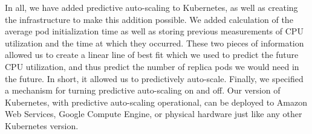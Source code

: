 In all, we have added predictive auto-scaling to Kubernetes, as well as
creating the infrastructure to make this addition possible. We added calculation of
the average pod initialization time as well as storing previous measurements of
CPU utilization and the time at which they occurred. These two pieces of
information allowed us to create a linear line of best fit which we used to
predict the future CPU utilization, and thus predict the number of replica pods
we would need in the future. In short, it allowed us to predictively auto-scale.
Finally, we specified a mechanism for turning predictive auto-scaling on and
off. Our version of Kubernetes, with predictive auto-scaling operational, can be
deployed to Amazon Web Services, Google Compute Engine, or physical hardware
just like any other Kubernetes version.
